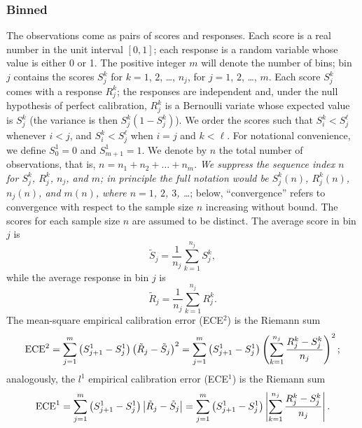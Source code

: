 \documentclass{article}
\begin{document}
\subsubsection{Binned}
\label{binnedsub}

The observations come as pairs of scores and responses.
Each score is a real number in the unit interval $[0, 1]$;
each response is a random variable whose value is either 0 or 1.
The positive integer $m$ will denote the number of bins;
bin $j$ contains the scores $S_j^k$ for $k = 1$, $2$, \dots, $n_j$,
for $j = 1$, $2$, \dots, $m$.
Each score $S_j^k$ comes with a response $R_j^k$;
the responses are independent and, under the null hypothesis
of perfect calibration, $R_j^k$ is a Bernoulli variate whose expected value
is $S_j^k$ (the variance is then $S_j^k \left( 1 - S_j^k \right)$).
We order the scores such that $S_i^k < S_j^\ell$ whenever $i < j$,
and $S_i^k < S_j^\ell$ when $i = j$ and $k < \ell$.
For notational convenience,
we define $S_0^1 = 0$ and $S_{m+1}^1 = 1$.
We denote by $n$ the total number of observations, that is,
$n = n_1 + n_2 + \dots + n_m$.
{\it We suppress the sequence index $n$ for $S_j^k$, $R_j^k$, $n_j$, and $m$;
in principle the full notation would be $S_j^k(n)$, $R_j^k(n)$, $n_j(n)$,
and $m(n)$, where $n = 1$, $2$, $3$, \dots};
below, ``convergence'' refers to convergence with respect
to the sample size $n$ increasing without bound.
The scores for each sample size $n$ are assumed to be distinct.
The average score in bin $j$ is
%
\begin{equation}
\label{avgscore}
\tilde{S}_j = \frac{1}{n_j} \sum_{k=1}^{n_j} S_j^k,
\end{equation}
%
while the average response in bin $j$ is
%
\begin{equation}
\label{avgresponse}
\tilde{R}_j = \frac{1}{n_j} \sum_{k=1}^{n_j} R_j^k.
\end{equation}
%
The mean-square empirical calibration error (ECE$^2$) is the Riemann sum
%
\begin{equation}
\label{l2}
\hbox{ECE}^2 = \sum_{j=1}^m \left( S_{j+1}^1 - S_j^1 \right)
\left( \tilde{R}_j - \tilde{S}_j \right)^2
= \sum_{j=1}^m \left(S_{j+1}^1 - S_j^1 \right)
\left( \sum_{k=1}^{n_j} \frac{R_j^k - S_j^k}{n_j} \right)^2;
\end{equation}
%
analogously, the $l^1$ empirical calibration error (ECE$^1$) is the Riemann sum
%
\begin{equation}
\label{l1}
\hbox{ECE}^1 = \sum_{j=1}^m \left( S_{j+1}^1 - S_j^1 \right)
\left| \tilde{R}_j - \tilde{S}_j \right|
= \sum_{j=1}^m \left(S_{j+1}^1 - S_j^1 \right)
\left| \sum_{k=1}^{n_j} \frac{R_j^k - S_j^k}{n_j} \right|.
\end{equation}
\end{document}
